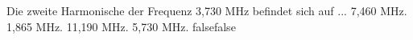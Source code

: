     {Die zweite Harmonische der Frequenz 3,730 MHz befindet sich auf ...}
    {7,460 MHz.}
    {1,865 MHz.}
    {11,190 MHz.}
    {5,730 MHz.}
    {false}{false}